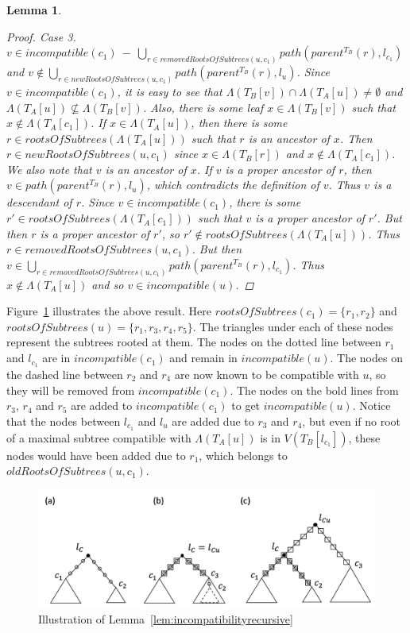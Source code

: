 \documentclass{article}
\newcommand{\leafset}{\Lambda}
\newtheorem{incompatibilityrecursive}[incompatibility]{Lemma}
\begin{document}
\begin{incompatibilityrecursive}
\begin{proof}
            \textit{Case 3.} $v \in incompatible(c_1)\ -\ \bigcup_{r \in removedRootsOfSubtrees(u, c_1)} path(parent^{T_B}(r), l_{c_1})$ and $v \not\in \bigcup_{r \in newRootsOfSubtrees(u, c_1)} path(parent^{T_B}(r), l_u)$. Since $v \in incompatible(c_1)$, it is easy to see that $\leafset(T_B[v]) \cap \leafset(T_A[u]) \neq \emptyset$ and $\leafset(T_A[u]) \not\subseteq \leafset(T_B[v])$. Also, there is some leaf $x \in \leafset(T_B[v])$ such that $x \not\in \leafset(T_A[c_1])$. If $x \in \leafset(T_A[u])$, then there is some $r \in rootsOfSubtrees(\leafset(T_A[u]))$ such that $r$ is an ancestor of $x$. Then $r \in newRootsOfSubtrees(u, c_1)$ since $x \in \leafset(T_B[r])$ and $x \not\in \leafset(T_A[c_1])$. We also note that $v$ is an ancestor of $x$. If $v$ is a proper ancestor of $r$, then $v \in path(parent^{T_B}(r), l_u)$, which contradicts the definition of $v$. Thus $v$ is a descendant of $r$. Since $v \in incompatible(c_1)$, there is some $r' \in rootsOfSubtrees(\leafset(T_A[c_1]))$ such that $v$ is a proper ancestor of $r'$. But then $r$ is a proper ancestor of $r'$, so $r' \not\in rootsOfSubtrees(\leafset(T_A[u]))$. Thus $r \in removedRootsOfSubtrees(u, c_1)$. But then $v \in \bigcup_{r \in removedRootsOfSubtrees(u, c_1)} path(parent^{T_B}(r), l_{c_1})$. Thus $x \not\in \leafset(T_A[u])$ and so $v \in incompatible(u)$.
        \end{proof}
    \end{incompatibilityrecursive}

    Figure~\ref{fig:incompatibilityrecursive} illustrates the above result. Here $rootsOfSubtrees(c_1) = \{r_1, r_2\}$ and $rootsOfSubtrees(u) = \{r_1, r_3, r_4, r_5\}$. The triangles under each of these nodes represent the subtrees rooted at them. The nodes on the dotted line between $r_1$ and $l_{c_1}$ are in $incompatible(c_1)$ and remain in $incompatible(u)$. The nodes on the dashed line between $r_2$ and $r_4$ are now known to be compatible with $u$, so they will be removed from $incompatible(c_1)$. The nodes on the bold lines from $r_3$, $r_4$ and $r_5$ are added to $incompatible(c_1)$ to get $incompatible(u)$. Notice that the nodes between $l_{c_1}$ and $l_u$ are added due to $r_3$ and $r_4$, but even if no root of a maximal subtree compatible with $\leafset(T_A[u])$ is in $V(T_B[l_{c_1}])$, these nodes would have been added due to $r_1$, which belongs to $oldRootsOfSubtrees(u, c_1)$.

    \begin{figure}[h]
        \includegraphics[scale=0.5]{incompatibilityrecursive}
        \centering
        \caption{Illustration of Lemma~\ref{lem:incompatibilityrecursive}}
        \label{fig:incompatibilityrecursive}
    \end{figure}
\end{document}
